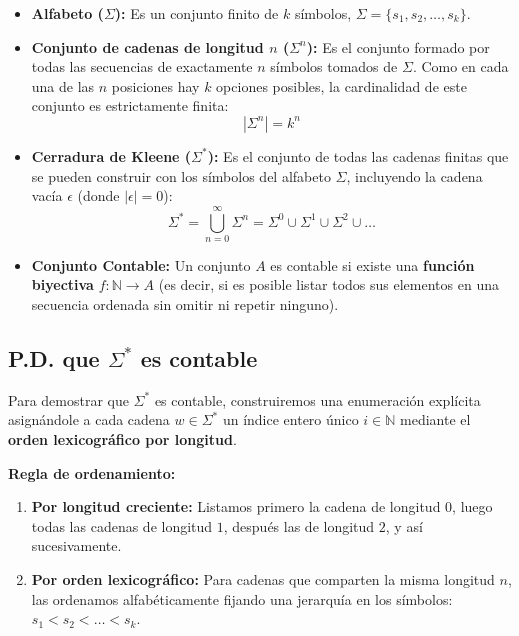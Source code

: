 \begin{itemize}[leftmargin=*]
    \item \textbf{Alfabeto ($\Sigma$):} Es un conjunto finito de $k$ símbolos, $\Sigma = \{s_1, s_2, \dots, s_k\}$.
    \item \textbf{Conjunto de cadenas de longitud $n$ ($\Sigma^n$):} Es el conjunto formado por todas las secuencias de exactamente $n$ símbolos tomados de $\Sigma$. Como en cada una de las $n$ posiciones hay $k$ opciones posibles, la cardinalidad de este conjunto es estrictamente finita:
    \[ |\Sigma^n| = k^n \]
    \item \textbf{Cerradura de Kleene ($\Sigma^*$):} Es el conjunto de todas las cadenas finitas que se pueden construir con los símbolos del alfabeto $\Sigma$, incluyendo la cadena vacía $\epsilon$ (donde $|\epsilon| = 0$):
    \[ \Sigma^* = \bigcup_{n=0}^{\infty} \Sigma^n = \Sigma^0 \cup \Sigma^1 \cup \Sigma^2 \cup \dots \]
    \item \textbf{Conjunto Contable:} Un conjunto $A$ es contable si existe una \textbf{función biyectiva} $f: \mathbb{N} \to A$ (es decir, si es posible listar todos sus elementos en una secuencia ordenada sin omitir ni repetir ninguno).
\end{itemize}

\vspace{10pt}
\subsection*{P.D. que $\Sigma^*$ es contable}

Para demostrar que $\Sigma^*$ es contable, construiremos una enumeración explícita asignándole a cada cadena $w \in \Sigma^*$ un índice entero único $i \in \mathbb{N}$ mediante el \textbf{orden lexicográfico por longitud}.

\textbf{Regla de ordenamiento:}
\begin{enumerate}[label=\arabic*., leftmargin=*]
    \item \textbf{Por longitud creciente:} Listamos primero la cadena de longitud $0$, luego todas las cadenas de longitud $1$, después las de longitud $2$, y así sucesivamente.
    \item \textbf{Por orden lexicográfico:} Para cadenas que comparten la misma longitud $n$, las ordenamos alfabéticamente fijando una jerarquía en los símbolos: $s_1 < s_2 < \dots < s_k$.
\end{enumerate}

\vspace{10pt}
